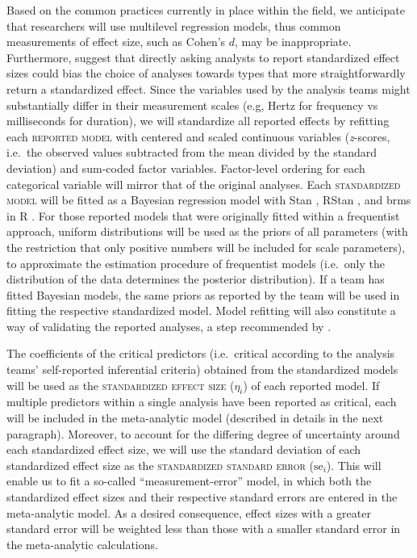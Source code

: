 \documentclass[Review,times,sageh]{sagej}
\begin{document}
Based on the common practices currently in place within the field, we
anticipate that researchers will use multilevel regression models, thus
common measurements of effect size, such as Cohen's \(d\), may be
inappropriate. Furthermore, \citet{aczel2021} suggest that directly
asking analysts to report standardized effect sizes could bias the
choice of analyses towards types that more straightforwardly return a
standardized effect. Since the variables used by the analysis teams
might substantially differ in their measurement scales (e.g, Hertz for
frequency vs milliseconds for duration), we will standardize all
reported effects by refitting each \textsc{reported model} with centered
and scaled continuous variables (\emph{z}-scores, i.e.~the observed
values subtracted from the mean divided by the standard deviation) and
sum-coded factor variables. Factor-level ordering for each categorical
variable will mirror that of the original analyses. Each
\textsc{standardized model} will be fitted as a Bayesian regression
model with Stan \citep{stan2021}, RStan \citep{stan2020a}, and brms
\citep{burkner2017} in R \citep{R-base}. For those reported models that
were originally fitted within a frequentist approach, uniform
distributions will be used as the priors of all parameters (with the
restriction that only positive numbers will be included for scale
parameters), to approximate the estimation procedure of frequentist
models (i.e.~only the distribution of the data determines the posterior
distribution). If a team has fitted Bayesian models, the same priors as
reported by the team will be used in fitting the respective standardized
model. Model refitting will also constitute a way of validating the
reported analyses, a step recommended by \citet{aczel2021}.

The coefficients of the critical predictors (i.e.~critical according to
the analysis teams' self-reported inferential criteria) obtained from
the standardized models will be used as the
\textsc{standardized effect size} (\(\eta_i\)) of each reported model.
If multiple predictors within a single analysis have been reported as
critical, each will be included in the meta-analytic model (described in
details in the next paragraph). Moreover, to account for the differing
degree of uncertainty around each standardized effect size, we will use
the standard deviation of each standardized effect size as the
\textsc{standardized standard error} (\(\text{se}_i\)). This will enable
us to fit a so-called ``measurement-error'' model, in which both the
standardized effect sizes and their respective standard errors are
entered in the meta-analytic model. As a desired consequence, effect
sizes with a greater standard error will be weighted less than those
with a smaller standard error in the meta-analytic calculations.
\end{document}
